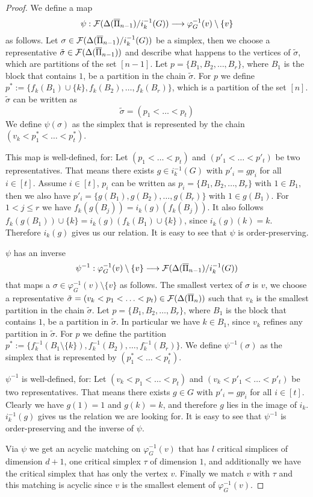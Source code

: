 \documentclass{elsarticle}
\begin{document}
\begin{proof}
We define a map
\[
\psi:{\cal F}(\Delta(\overline{\Pi}_{n-1})/i_k^{-1}(G))\longrightarrow\varphi_G^{-1}(v)\setminus\{v\}
\]
as follows. Let $\sigma\in{\cal F}(\Delta(\overline{\Pi}_{n-1})/i_k^{-1}(G))$ be a simplex, then we choose a representative $\tilde\sigma\in{\cal F}(\Delta(\overline{\Pi}_{n-1}))$ and describe what happens to the vertices of $\tilde\sigma$, which are partitions of the set $[n-1]$. Let $p=\{B_1,B_2,\dots,B_r\}$, where $B_1$ is the block that contains $1$, be a partition in the chain $\tilde\sigma$. For $p$ we define $p^*:=\{f_k(B_1)\cup\{k\},f_k(B_2),\dots,f_k(B_r)\}$, which is a partition of the set $[n]$. $\tilde\sigma$ can be written as
\[
\tilde\sigma=(p_1<\ldots<p_t)
\]
We define $\psi(\sigma)$ as the simplex that is represented by the chain $(v_k<p^*_1<\ldots<p^*_t)$.

This map is well-defined, for: Let $(p_1<\ldots<p_t)$ and $(p'_1<\ldots<p'_t)$ be two representatives. That means there exists $g\in i_k^{-1}(G)$ with $p'_i=gp_i$ for all $i\in[t]$. Assume $i\in[t]$, $p_i$ can be written as $p_i=\{B_1,B_2,\dots,B_r\}$ with $1\in B_1$, then we also have $p'_i=\{g(B_1),g(B_2),\dots,g(B_r)\}$ with $1\in g(B_1)$. For $1<j\leq r$ we have $f_k(g(B_j))=i_k(g)(f_k(B_j))$. It also follows $f_k(g(B_1))\cup\{k\}=i_k(g)(f_k(B_1)\cup\{k\})$, since $i_k(g)(k)=k$. Therefore $i_k(g)$ gives us our relation. It is easy to see that $\psi$ is order-preserving.

$\psi$ has an inverse
\[
\psi^{-1}:\varphi_G^{-1}(v)\setminus\{v\}\longrightarrow{\cal F}(\Delta(\overline{\Pi}_{n-1})/i_k^{-1}(G))
\]
that maps a $\sigma\in\varphi_G^{-1}(v)\setminus\{v\}$ as follows. The smallest vertex of $\sigma$ is $v$, we choose a representative $\tilde\sigma=(v_k<p_1<\ldots<p_t)\in{\cal F}(\Delta(\overline{\Pi}_n))$ such that $v_k$ is the smallest partition in the chain $\tilde\sigma$. Let $p=\{B_1,B_2,\dots,B_r\}$, where $B_1$ is the block that contains $1$, be a partition in $\tilde\sigma$. In particular we have $k\in B_1$, since $v_k$ refines any partition in $\tilde\sigma$. For $p$ we define the partition $p^*:=\{f_k^{-1}(B_1\setminus\{k\}),f_k^{-1}(B_2),\dots,f_k^{-1}(B_r)\}$. We define $\psi^{-1}(\sigma)$ as the simplex that is represented by $(p^*_1<\ldots<p^*_t)$.

$\psi^{-1}$ is well-defined, for: Let $(v_k<p_1<\ldots<p_t)$ and $(v_k<p'_1<\ldots<p'_t)$ be two representatives. That means there exists $g\in G$ with $p'_i=gp_i$ for all $i\in[t]$. Clearly we have $g(1)=1$ and $g(k)=k$, and therefore $g$ lies in the image of $i_k$. $i_k^{-1}(g)$ gives us the relation we are looking for. It is easy to see that $\psi^{-1}$ is order-preserving and the inverse of $\psi$.

Via $\psi$ we get an acyclic matching on $\varphi_G^{-1}(v)$ that has $l$ critical simplices of dimension $d+1$, one critical simplex $\tau$ of dimension $1$, and additionally we have the critical simplex that has only the vertex $v$. Finally we match $v$ with $\tau$ and this matching is acyclic since $v$ is the smallest element of $\varphi_G^{-1}(v)$.
\end{proof}
\end{document}

